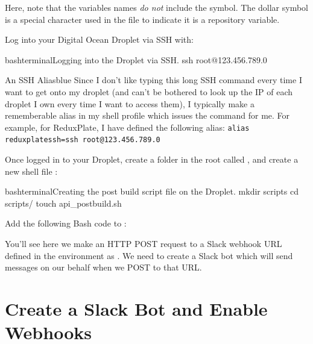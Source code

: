 \documentclass[paper=6in:9in,pagesize=pdftex,headinclude=on,footinclude=on,12pt,twoside]{scrbook}
\newcommand{\dollar}{\$}
\begin{document}
Here, note that the variables names \textit{do not} include the \codeword{\dollar} symbol. The dollar symbol is a special character used in the  file to indicate it is a repository variable.


Log into your Digital Ocean Droplet via SSH with:

\begin{codeInput}{bash}{terminal}{Logging into the Droplet via SSH.}
ssh root@123.456.789.0
\end{codeInput}

\begin{highlightBox}{An SSH Alias}{blue}{\information}
Since I don't like typing this long SSH command every time I want to get onto my droplet (and can't be bothered to look up the IP of each droplet I own every time I want to access them), I typically make a rememberable alias in my shell profile which issues the command for me. For example, for ReduxPlate, I have defined the following alias: \texttt{alias reduxplatessh=ssh root@123.456.789.0}
\end{highlightBox}


Once logged in to your Droplet, create a folder in the root called , and create a new shell file : 

\begin{codeInput}{bash}{terminal}{Creating the post build script file on the Droplet.}
mkdir scripts
cd scripts/
touch api_postbuild.sh
\end{codeInput}

Add the following Bash code to :


You'll see here we make an HTTP POST request to a Slack webhook URL defined in the environment as . We need to create a Slack bot which will send messages on our behalf when we POST to that URL.

\section{Create a Slack Bot and Enable Webhooks}
\end{document}
